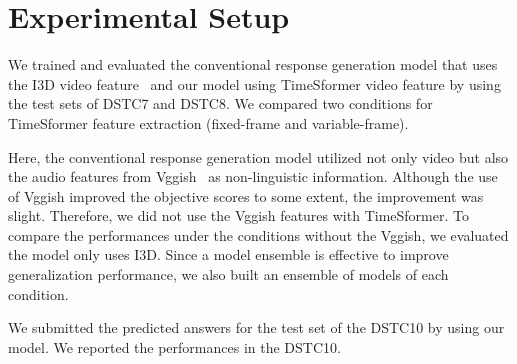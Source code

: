 \documentclass[letterpaper]{article} %
\begin{document}
\section{Experimental Setup}
We trained and evaluated the conventional response generation model that uses the I3D video feature~\cite{Li2021bridging} and our model using TimeSformer video feature by using the test sets of DSTC7 and DSTC8.
We compared two conditions for TimeSformer feature extraction (fixed-frame and variable-frame).

Here, the conventional response generation model utilized not only video but also the audio features from Vggish~\cite{Hershey2017cnn} as non-linguistic information.
% 
Although the use of Vggish improved the objective scores to some extent, the improvement was slight.
Therefore, we did not use the Vggish features with TimeSformer.
To compare the performances under the conditions without the Vggish, we evaluated the model only uses I3D.
% 
Since a model ensemble is effective to improve generalization performance, we also built an ensemble of models of each condition.

We submitted the predicted answers for the test set of the DSTC10 by using our model.
We reported the performances in the DSTC10.
\end{document}
